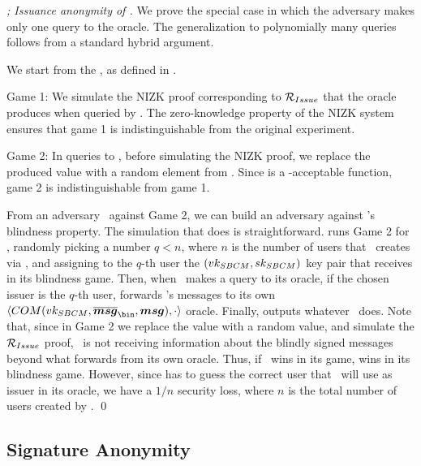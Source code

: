 \begin{proof}[; Issuance anonymity of \CUASGen]
  We prove the special case in which the adversary makes only one query to the
  \OBTCHALb oracle. The generalization to polynomially many queries follows
  from a standard hybrid argument.

  We start from the \ExpIssAnonb, as defined in . 

  Game 1: We simulate the NIZK proof corresponding to $\mathcal{R}_{Issue}$ that
  the \OBTCHALb oracle produces when queried by \adv. The zero-knowledge
  property of the NIZK system ensures that game 1 is indistinguishable from
  the original experiment.

  Game 2: In queries to \OBTCHALb, before simulating the NIZK proof, we replace
  the produced \yissue value with a random element from \rngfissue. Since
  \fissue is a \UAS-acceptable function, game 2 is indistinguishable from game
  1.

  From an adversary \adv~against Game 2, we can build an adversary \advB against
  \SBCM's blindness property. The simulation that
  \advB does is straightforward. \advB runs Game 2 for \adv, randomly picking
  a number $q < n$, where $n$ is the number of users that \adv~creates via
  \HUGEN, and assigning to the $q$-th user the $(vk_{SBCM},sk_{SBCM})$ key pair
  that \advB receives in its blindness game. Then, when \adv~makes a query
  to its \OBTCHALb oracle, if the chosen issuer is the $q$-th user, \advB
  forwards \adv's messages to its own $\langle COM(\SBCMvk,
  \overline{\smsg}_{\bin},\smsg),\cdot\rangle$ oracle. Finally, \advB outputs
  whatever \adv~does. Note that, since in Game 2 we replace the \yissue value
  with a random value, and simulate the $\mathcal{R}_{Issue}$ proof, \adv~is not
  receiving information about the blindly signed messages beyond what \advB
  forwards from its own oracle. Thus, if \adv~wins in its game, \advB wins in
  its blindness game. However, since \advB has to guess the correct user
  that \adv~will use as issuer in its \OBTCHALb oracle, we have a $1/n$ security
  loss, where $n$ is the total number of users created by \adv.
  \qed
\end{proof}

\subsection{Signature Anonymity}

